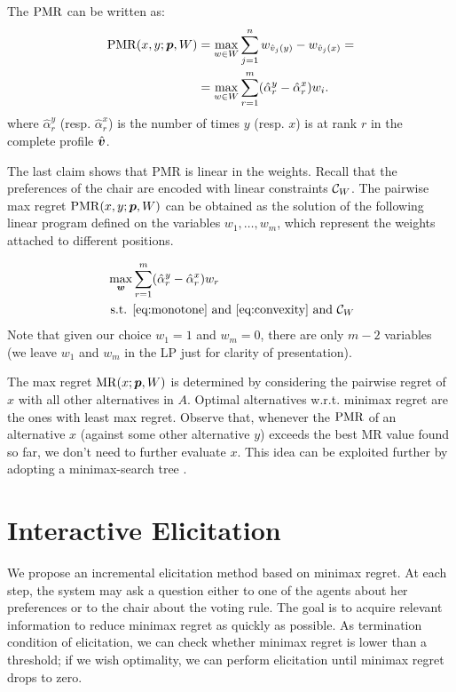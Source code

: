 \documentclass[sigconf, anonymous]{aamas}
\begin{document}
\begin{claim}
	The $\operatorname{PMR}$ can be written as:
	\begin{align} 
		\operatorname{PMR}(x,y; {\bm{p}}, W)  
		& = \max_{w \in W} \sum_{j=1}^n w_{\hat{v}_j(y)} - w_{\hat{v}_j(x)} = \\ 
		& = \max_{w \in W} \sum_{r=1}^m (\hat{\alpha}_{r}^{y} - \hat{\alpha}_{r}^{x}) w_i. 
	\end{align}
	where $\hat{\alpha}_{r}^{y}$ (resp. $\hat{\alpha}_{r}^{x}$)  is the number of times $y$ (resp. $x$) is at rank $r$ in the complete profile $\hat{\bm{v}}$.
\end{claim}
The last claim shows that PMR is linear in the weights.
Recall that the preferences of the chair are encoded with linear constraints $\mathcal{C}_{W}$.
The pairwise max regret $\operatorname{PMR}(x,y; {\bm{p}},W)$ can be obtained as the solution of the following linear program defined on the variables $w_1, …, w_m$, which represent the weights attached to different positions. 

\begin{align}
	\max_{\w} & \sum_{r=1}^m (\hat{\alpha}_{r}^{y} - \hat{\alpha}_{r}^{x}) w_{r}\\
	\text{ s.t. } & \text{\cref{eq:monotone}} \text{ and } \text{\cref{eq:convexity}} \text{ and } \Co_W
\end{align}
Note that given our choice $w_{1}=1$ and $w_{m}=0$, there are only $m-2$ variables 
(we leave $w_{1}$ and $w_{m}$ in the LP just for clarity of presentation).

The max regret $\operatorname{MR}(x; {\bm{p}}, W)$ is determined by considering the pairwise regret of $x$ with all other alternatives in $A$.
Optimal alternatives w.r.t. minimax regret are the ones with least max regret. 
Observe that, whenever the $\operatorname{PMR}$ of an alternative $x$ (against some other alternative $y$) exceeds the best MR value found so far, we don't need to further evaluate $x$. 
This idea can be exploited further by adopting a minimax-search tree \citep{Braziunas2011}.

\section{Interactive Elicitation} 
\label{sec:elicit}
We propose an incremental elicitation method based on minimax regret.
At each step, the system may ask a question either to one of the agents about her preferences or to the chair about the voting rule. 
The goal is to acquire relevant information to reduce minimax regret as quickly as possible.
As termination condition of elicitation, we can check whether minimax regret is lower than a threshold; if we wish optimality, we can perform elicitation until minimax regret drops to zero.
\end{document}
